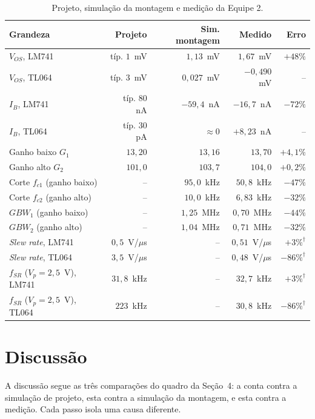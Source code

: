 \documentclass[11pt,a4paper]{article}
\begin{document}
\begin{table}[H]
\centering
\caption{Projeto, simulação da montagem e medição da Equipe 2.}
\label{tab:resumo_equipe}
\renewcommand{\arraystretch}{1.2}
\begin{tabular}{@{}lrrrr@{}}
\toprule
\textbf{Grandeza} & \textbf{Projeto} & \textbf{Sim. montagem} & \textbf{Medido} & \textbf{Erro} \\
\midrule
$V_{OS}$, LM741 & típ. $1$~mV & $1{,}13$~mV & $1{,}67$~mV & $+48\%$ \\
$V_{OS}$, TL064 & típ. $3$~mV & $0{,}027$~mV & $-0{,}490$~mV & -- \\
$I_B$, LM741 & típ. $80$~nA & $-59{,}4$~nA & $-16{,}7$~nA & $-72\%$ \\
$I_B$, TL064 & típ. $30$~pA & $\approx0$ & $+8{,}23$~nA & -- \\
Ganho baixo $G_1$ & $13{,}20$ & $13{,}16$ & $13{,}70$ & $+4{,}1\%$ \\
Ganho alto $G_2$ & $101{,}0$ & $103{,}7$ & $104{,}0$ & $+0{,}2\%$ \\
Corte $f_{c1}$ (ganho baixo) & -- & $95{,}0$~kHz & $50{,}8$~kHz & $-47\%$ \\
Corte $f_{c2}$ (ganho alto) & -- & $10{,}0$~kHz & $6{,}83$~kHz & $-32\%$ \\
$GBW_1$ (ganho baixo) & -- & $1{,}25$~MHz & $0{,}70$~MHz & $-44\%$ \\
$GBW_2$ (ganho alto) & -- & $1{,}04$~MHz & $0{,}71$~MHz & $-32\%$ \\
\textit{Slew rate}, LM741 & $0{,}5$~V/$\mu$s & -- & $0{,}51$~V/$\mu$s & $+3\%^{\dagger}$ \\
\textit{Slew rate}, TL064 & $3{,}5$~V/$\mu$s & -- & $0{,}48$~V/$\mu$s & $-86\%^{\dagger}$ \\
$f_{SR}$ ($V_p=2{,}5$~V), LM741 & $31{,}8$~kHz & -- & $32{,}7$~kHz & $+3\%^{\dagger}$ \\
$f_{SR}$ ($V_p=2{,}5$~V), TL064 & $223$~kHz & -- & $30{,}8$~kHz & $-86\%^{\dagger}$ \\
\bottomrule
\end{tabular}
\end{table}

\section{Discussão}

A discussão segue as três comparações do quadro da Seção~4: a conta contra a simulação de projeto,
esta contra a simulação da montagem, e esta contra a medição. Cada passo isola uma causa
diferente.
\end{document}
